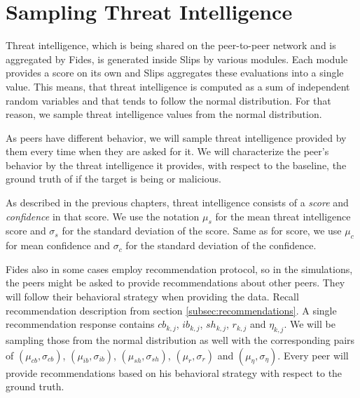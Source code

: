 \section{Sampling Threat Intelligence}
\label{sec:sampling-threat-intelligence}
Threat intelligence, which is being shared on the peer-to-peer network and is aggregated by Fides, is generated inside Slips by various modules.
Each module provides a score on its own and Slips aggregates these evaluations into a single value. 
This means, that threat intelligence is computed as a sum of independent random variables and that tends to follow the normal distribution. 
For that reason, we sample threat intelligence values from the normal distribution.

As peers have different behavior, we will sample threat intelligence provided by them every time when they are asked for it.
We will characterize the peer's behavior by the threat intelligence it provides, with respect to the baseline, the ground truth of if the target is being or malicious.

As described in the previous chapters, threat intelligence consists of a \textit{score} and \textit{confidence} in that score.
We use the notation $\mu_{s}$ for the mean threat intelligence score and $\sigma_{s}$ for the standard deviation of the score. 
Same as for score, we use $\mu_{c}$ for mean confidence and $\sigma_{c}$ for the standard deviation of the confidence. 

Fides also in some cases employ recommendation protocol, so in the simulations, the peers might be asked to provide recommendations about other peers.
They will follow their behavioral strategy when providing the data. 
Recall recommendation description from section \ref{subsec:recommendations}. A single recommendation response contains $cb_{k,j}$, $ib_{k,j}$, $sh_{k,j}$, $r_{k,j}$ and $\eta_{k,j}$. 
We will be sampling those from the normal distribution as well with the corresponding pairs of $(\mu_{cb}, \sigma_{cb})$, $(\mu_{ib}, \sigma_{ib})$, $(\mu_{sh}, \sigma_{sh})$, $(\mu_{r}, \sigma_{r})$ and $(\mu_{\eta}, \sigma_{\eta})$.
Every peer will provide recommendations based on his behavioral strategy with respect to the ground truth.

